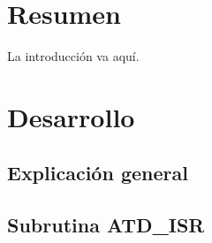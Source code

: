 \documentclass[12pt,letterpaper]{report} %
\begin{document}
\chapter{Resumen}

La introducción va aquí.
\newpage



\chapter{Desarrollo}

\section{Explicación general}


\newcommand{\subname}{ATD\_ISR}

\section{Subrutina \subname}
\end{document}
